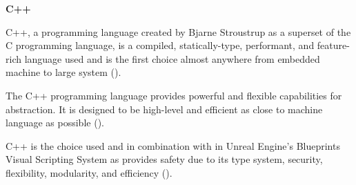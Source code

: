 \flushleft
\textbf{C++}\\
\justifying

\parx
C++, a programming language created by Bjarne Stroustrup as a superset of the
C programming language, is a compiled, statically-type, performant, and
feature-rich language used and is the first choice almost anywhere from
embedded machine to large system (\cite{cpp_2020}).

The C++ programming language provides powerful and flexible capabilities for
abstraction. It is designed to be high-level and efficient as close to
machine language as possible (\cite{stroustrup_1999}).

C++ is the choice used and in combination with in Unreal Engine's Blueprints
Visual Scripting System as provides safety due to its type system, security,
flexibility, modularity, and efficiency (\cite{chu_zaman_2021}).

